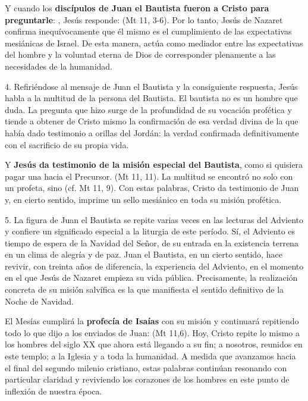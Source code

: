 \begin{body}
					Y cuando los \textbf{discípulos de Juan el Bautista fueron a Cristo para preguntarle}: , Jesús responde:  (Mt 11, 3-6). Por lo tanto, Jesús de Nazaret confirma inequívocamente que él mismo es el cumplimiento de las expectativas mesiánicas de Israel. De esta manera, actúa como mediador entre las expectativas del hombre y la voluntad eterna de Dios de corresponder plenamente a las necesidades de la humanidad.
					
					4. Refiriéndose al mensaje de Juan el Bautista y la consiguiente respuesta, Jesús habla a la multitud de la persona del Bautista. El bautista no es un hombre que duda. La pregunta que hizo surge de la profundidad de su vocación profética y tiende a obtener de Cristo mismo la confirmación de esa verdad divina de la que había dado testimonio a orillas del Jordán: la verdad confirmada definitivamente con el sacrificio de su propia vida.
					
					Y \textbf{Jesús da testimonio de la misión especial del Bautista}, como si quisiera pagar una  hacia el Precursor.  (Mt 11, 11). La multitud se encontró no solo con un profeta, sino  (cf. Mt 11, 9). Con estas palabras, Cristo da testimonio de Juan y, en cierto sentido, imprime un sello mesiánico en toda su misión profética.
					
					5. La figura de Juan el Bautista se repite varias veces en las lecturas del Adviento y confiere un significado especial a la liturgia de este período. Sí, el Adviento es tiempo de espera de la Navidad del Señor, de su entrada en la existencia terrena en un clima de alegría y de paz. Juan el Bautista, en un cierto sentido, hace revivir, con treinta años de diferencia, la experiencia del Adviento, en el momento en el que Jesús de Nazaret empieza su vida pública. Precisamente, la realización concreta de su misión salvífica es la que manifiesta el sentido definitivo de la Noche de Navidad.
					
					El Mesías cumplirá la \textbf{profecía de Isaías} con su misión y continuará repitiendo todo lo que dijo a los enviados de Juan:  (Mt 11,6). Hoy, Cristo repite lo mismo a los hombres del siglo XX que ahora está llegando a su fin; a nosotros, reunidos en este templo; a la Iglesia y a toda la humanidad. A medida que avanzamos hacia el final del segundo milenio cristiano, estas palabras continúan resonando con particular claridad y reviviendo los corazones de los hombres en este punto de inflexión de nuestra época.
					

\end{body}
